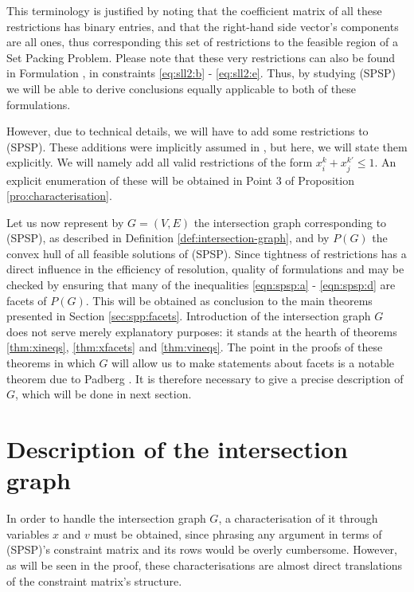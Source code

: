 \noindent
This terminology is justified by noting that the coefficient matrix of all these
restrictions has binary entries, and that the right-hand side vector's
components are all ones, thus corresponding this set of restrictions to the
feasible region of a Set Packing Problem. Please note that these very
restrictions can also be found in Formulation \sllb, in constraints
\eqref{eq:sll2:b} - \eqref{eq:sll2:e}. Thus, by studying (SPSP) we will be able
to derive conclusions equally applicable to both of these formulations.

However, due to technical details, we will have to add some restrictions to
(SPSP). These additions were implicitly assumed in \cite{ca:rpp}, but here, we
will state them explicitly. We will namely add all valid restrictions of the form
$x_i^k + x_j^{k'} \leq 1$. An explicit enumeration of these will be obtained in
Point 3 of Proposition \ref{pro:characterisation}.

Let us now represent by $G = (V, E)$ the intersection graph corresponding to
(SPSP), as described in Definition \ref{def:intersection-graph}, and by $P(G)$ the convex
hull of all feasible solutions of (SPSP). Since tightness of restrictions has a
direct influence in the efficiency of resolution, quality of formulations \slla
and \sllb may be checked by ensuring that many of the inequalities
\eqref{eqn:spsp:a} - \eqref{eqn:spsp:d} are facets of $P(G)$. This will be
obtained as conclusion to the main theorems presented in Section
\ref{sec:spp:facets}.  Introduction of the intersection graph $G$ does not serve
merely explanatory purposes: it stands at the hearth of theorems
\ref{thm:xineqs}, \ref{thm:xfacets} and \ref{thm:vineqs}. The point in the
proofs of these theorems in which $G$ will allow us to make statements about
facets is a notable theorem due to Padberg \cite{pa:facial-structure}. It is
therefore necessary to give a precise description of $G$, which will be done in
next section.

\section{Description of the intersection graph} %
\label{sec:spp:intersection-graph}

In order to handle the intersection graph $G$, a characterisation of it through
variables $x$ and $v$ must be obtained, since phrasing any argument in terms of
(SPSP)'s constraint matrix and its rows would be overly cumbersome. However, as
will be seen in the proof, these characterisations are almost direct
translations of the constraint matrix's structure.

